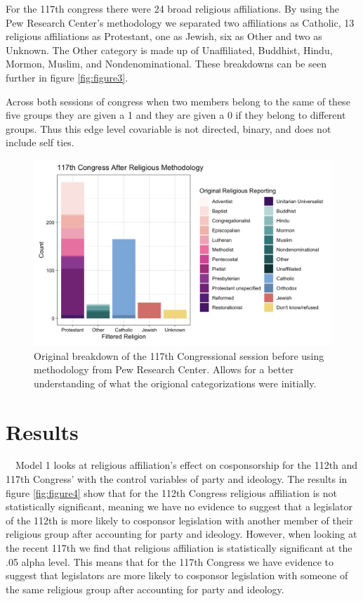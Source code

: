 \documentclass[Royal,times,sageh]{sagej}
\begin{document}
For the 117th congress there were 24 broad religious affiliations. By
using the Pew Research Center's methodology we separated two
affiliations as Catholic, 13 religious affiliations as Protestant, one
as Jewish, six as Other and two as Unknown. The Other category is made
up of Unaffiliated, Buddhist, Hindu, Mormon, Muslim, and
Nondenominational. These breakdowns can be seen further in figure
\ref{fig:figure3}.

Across both sessions of congress when two members belong to the same of
these five groups they are given a 1 and they are given a 0 if they
belong to different groups. Thus this edge level covariable is not
directed, binary, and does not include self ties.

\begin{figure}

{\centering \includegraphics[width=0.85\linewidth]{images/117th religious} 

}

\caption{Original breakdown of the 117th Congressional session before using methodology from Pew Research Center. Allows for a better understanding of what the origional categorizations were initially.\label{fig:figure3}}\label{fig:unnamed-chunk-3}
\end{figure}

\hypertarget{results}{%
\section{Results}\label{results}}

~~Model 1 looks at religious affiliation's effect on cosponsorship for
the 112th and 117th Congress' with the control variables of party and
ideology. The results in figure \ref{fig:figure4} show that for the
112th Congress religious affiliation is not statistically significant,
meaning we have no evidence to suggest that a legislator of the 112th is
more likely to cosponsor legislation with another member of their
religious group after accounting for party and ideology. However, when
looking at the recent 117th we find that religious affiliation is
statistically significant at the .05 alpha level. This means that for
the 117th Congress we have evidence to suggest that legislators are more
likely to cosponsor legislation with someone of the same religious group
after accounting for party and ideology.
\end{document}
